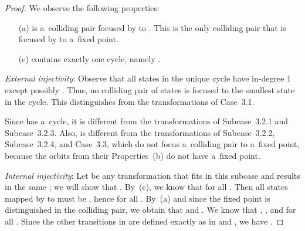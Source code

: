 \documentclass{amsart}
\begin{document}
\begin{proof}
We observe the following properties:
\begin{enumerate}
\item[(a)]  is a~colliding pair focused by  to .
This is the only colliding pair that is focused by  to a~fixed point.

\item[(c)]  contains exactly one cycle, namely .
\end{enumerate}

\textit{External injectivity}:
Observe that all states in the unique cycle have in-degree 1 except possibly .
Thus, no colliding pair of states is focused to the smallest state  in the cycle.
This distinguishes  from the transformations of Case~3.1.

Since  has a~cycle, it is different from the transformations of Subcase~3.2.1 and Subcase~3.2.3.
Also,  is different from the transformations of Subcase~3.2.2, Subcase~3.2.4, and Case~3.3, which do not focus a~colliding pair to a~fixed point, because the orbits from their Properties~(b) do not have a~fixed point.

\textit{Internal injectivity}:
Let  be any transformation that fits in this subcase and results in the same ; we will show that .
By~(c), we know that  for all .
Then all states mapped by  to  must be , hence  for all .
By~(a) and since the fixed point is distinguished in the colliding pair, we obtain that  and .
We know that , ,  and  for all .
Since the other transitions in  are defined exactly as in  and , we have .


\end{proof}
\end{document}
